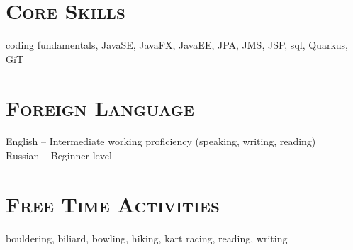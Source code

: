 \documentclass{article}
\begin{document}
\section{\textsc{Core Skills}}

coding fundamentals, JavaSE, JavaFX, JavaEE, JPA, JMS, JSP,  sql, Quarkus, GiT

\section{\textsc{Foreign Language}}

English  -- Intermediate working proficiency (speaking, writing, reading) \\
Russian -- Beginner level

\section{\textsc{Free Time Activities}}

bouldering, biliard, bowling, hiking, kart racing, reading, writing
\end{document}
